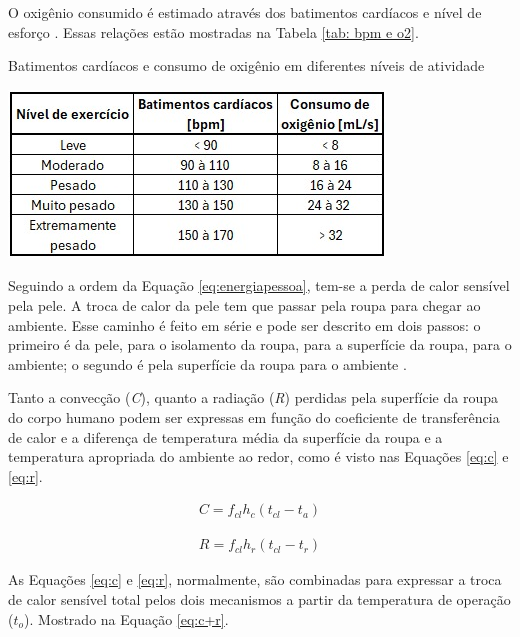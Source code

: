 \documentclass[acronym,symbols,table]{fei}
\begin{document}
O oxigênio consumido é estimado através dos batimentos cardíacos e nível de esforço \cite{aastrand2003textbook}. Essas relações estão mostradas na Tabela \ref{tab: bpm e o2}.

\begin{table}[!htb] 
 \centering
    \caption{Batimentos cardíacos e consumo de oxigênio em diferentes níveis de atividade}
    \includegraphics[width=0.5\linewidth]{Tabelas/bpm-o2.jpeg}
    \label{tab: bpm e o2}
\end{table}

Seguindo a ordem da Equação \ref{eq:energiapessoa}, tem-se a perda de calor sensível pela pele. A troca de calor da pele tem que passar pela roupa para chegar ao ambiente. Esse caminho é feito em série e pode ser descrito em dois passos: o primeiro é da pele, para o isolamento da roupa, para a superfície da roupa, para o ambiente; o segundo é pela superfície da roupa para o ambiente \cite{ASHRAE2009}.

Tanto a convecção (\textit{C}), quanto a radiação (\textit{R}) perdidas pela superfície da roupa do corpo humano podem ser expressas em função do coeficiente de transferência de calor e a diferença de temperatura média da superfície da roupa e a temperatura apropriada do ambiente ao redor, como é visto nas Equações \ref{eq:c} e \ref{eq:r}. 

\begin{equation} \label{eq:c}
    \begin{aligned}
    C = f_{cl} h_{c} (t_{cl} - t_{a})
    \end{aligned}
\end{equation}


\begin{equation} \label{eq:r}
    \begin{aligned}
    R = f_{cl} h_{r} (t_{cl} - t_{r})
    \end{aligned}
\end{equation}

As Equações \ref{eq:c} e \ref{eq:r}, normalmente, são combinadas para expressar a troca de calor sensível total pelos dois mecanismos a partir da temperatura de operação ($t_{o}$). Mostrado na Equação \ref{eq:c+r}.
\end{document}
